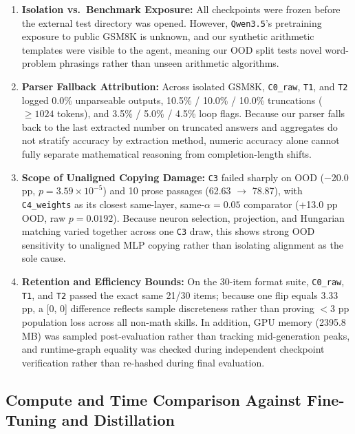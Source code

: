 \documentclass[11pt]{article}
\begin{document}
\begin{enumerate}
\item \textbf{Isolation vs.\ Benchmark Exposure:} All checkpoints were frozen before the external test directory was opened. However, \texttt{Qwen3.5}'s pretraining exposure to public GSM8K is unknown, and our synthetic arithmetic templates were visible to the agent, meaning our OOD split tests novel word-problem phrasings rather than unseen arithmetic algorithms.
\item \textbf{Parser Fallback Attribution:} Across isolated GSM8K, \texttt{C0\_raw}, \texttt{T1}, and \texttt{T2} logged 0.0\% unparseable outputs, 10.5\% / 10.0\% / 10.0\% truncations ($\ge 1024$ tokens), and 3.5\% / 5.0\% / 4.5\% loop flags. Because our parser falls back to the last extracted number on truncated answers and aggregates do not stratify accuracy by extraction method, numeric accuracy alone cannot fully separate mathematical reasoning from completion-length shifts.
\item \textbf{Scope of Unaligned Copying Damage:} \texttt{C3} failed sharply on OOD ($-$20.0 pp, $p = 3.59\times 10^{-5}$) and 10 prose passages (62.63 $\rightarrow$ 78.87), with \texttt{C4\_weights} as its closest same-layer, same-$\alpha=0.05$ comparator (+13.0 pp OOD, raw $p = 0.0192$). Because neuron selection, projection, and Hungarian matching varied together across one \texttt{C3} draw, this shows strong OOD sensitivity to unaligned MLP copying rather than isolating alignment as the sole cause.
\item \textbf{Retention and Efficiency Bounds:} On the 30-item format suite, \texttt{C0\_raw}, \texttt{T1}, and \texttt{T2} passed the exact same 21/30 items; because one flip equals 3.33 pp, a [0, 0] difference reflects sample discreteness rather than proving $< 3$ pp population loss across all non-math skills. In addition, GPU memory (2395.8 MB) was sampled post-evaluation rather than tracking mid-generation peaks, and runtime-graph equality was checked during independent checkpoint verification rather than re-hashed during final evaluation.
\end{enumerate}

\subsection{Compute and Time Comparison Against Fine-Tuning and Distillation}
\end{document}

